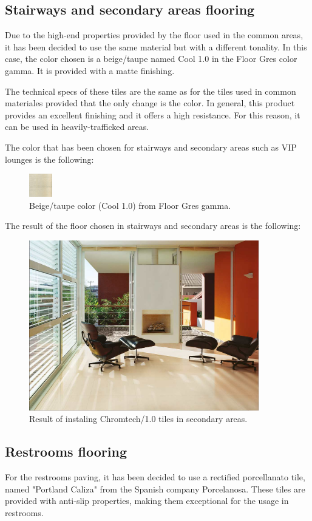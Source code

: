 		\subsection{Stairways and secondary areas flooring}
	Due to the high-end properties provided by the floor used in the common areas, it has been decided to use the same material but with a different tonality. In this case, the color chosen is  a beige/taupe named Cool 1.0 in the Floor Gres color gamma. It is provided with a matte finishing.
	
	The technical specs of these tiles are the same as for the tiles used in common materiales provided that the only change is the color. In general, this product provides an excellent finishing and it offers a high resistance. For this reason, it can be used in heavily-trafficked areas.
	
	The color that has been chosen for stairways and secondary areas such as VIP lounges is the following:
		\begin{figure}[ht!]
	\centering
\includegraphics[width=1cm]{./images/Color2}
\caption{Beige/taupe color (Cool 1.0) from Floor Gres gamma.}
\end{figure}

The result of the floor chosen in stairways and secondary areas is the following:
\begin{figure}[ht!]
	\centering
\includegraphics[width=10cm]{./images/Resultado2}
\caption{Result of instaling Chromtech/1.0 tiles in secondary areas.}
\end{figure}
		\subsection{Restrooms flooring}
	For the restrooms paving, it has been decided to use a rectified porcellanato tile, named "Portland Caliza" from the Spanish company Porcelanosa. These tiles are provided with anti-slip properties, making them exceptional for the usage in restrooms.
	
